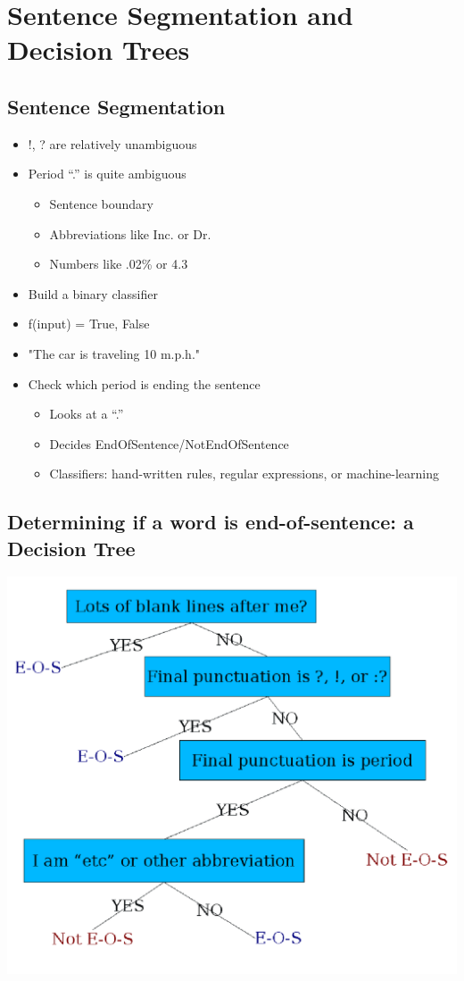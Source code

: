 \documentclass[11pt]{article}
\theoremstyle{definition}
\begin{document}
\section{Sentence Segmentation
and Decision Trees}
\subsection{Sentence Segmentation}
\begin{itemize}
  \item !, ? are relatively unambiguous
  \item Period “.” is quite ambiguous
  \begin{itemize}
    \item Sentence boundary
    \item Abbreviations like Inc. or Dr.
    \item Numbers like .02\% or 4.3
  \end{itemize}
  \item Build a binary classifier
  \item f(input) = {True, False}
  \item "The car is traveling 10 m.p.h." 
  \item Check which period is ending the sentence
  \begin{itemize}
    \item Looks at a “.”
    \item Decides EndOfSentence/NotEndOfSentence
    \item Classifiers: hand-written rules, regular expressions, or machine-learning
  \end{itemize}
\end{itemize}

\subsection{Determining if a word is end-of-sentence:
a Decision Tree}
\includegraphics[width=\textwidth/2]{6.png}
\end{document}
